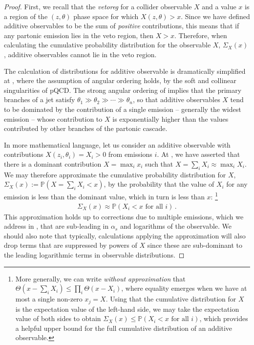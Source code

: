 \begin{proof}

First, we recall that the \emph{\gls{vetoreg}} for a collider observable \(X\) and a value \(x\) is a region of the \((z, \theta)\) phase space for which \(X(z,\theta) > x\).
%
Since we have defined additive observables to be the sum of \textit{positive} contributions, this means that if any partonic emission lies in the veto region, then \(X > x\).
%
Therefore, when calculating the cumulative probability distribution for the observable \(X\), \(\Sigma_X(x)\), additive observables cannot lie in the veto region.

The calculation of distributions for additive observable is dramatically simplified at , where the assumption of angular ordering holds, by the soft and collinear singularities of pQCD.
%
The strong angular ordering of  implies that the primary branches of a jet satisfy \(\theta_1 \gg \theta_2 \gg \cdots \gg \theta_n\), so that additive observables \(X\) tend to be dominated by the contribution of a single emission -- generally the widest emission -- whose contribution to \(X\) is exponentially higher than the values contributed by other branches of the partonic cascade.

In more mathematical language, let us consider an additive observable with contributions \(X(z_i, \theta_i) = X_i > 0\) from emissions \(i\).
%
At , we have asserted that there is a dominant contribution \(X = \max_i x_i\) such that \(X = \sum_i X_i \approx \max_i X_i\).
%
We may therefore approximate the cumulative probability distribution for \(X\), \(\Sigma_X(x) := \mathbb{P}(X = \sum_i X_i < x)\), by the probability that the value of \(X_i\) for any emission is less than the dominant value, which in turn is less than \(x\):%
\footnote{
    More generally, we can write \textit{without approximation} that \(\Theta(x - \sum_i X_i) \leq \prod_i \Theta(x - X_i)\), where equality emerges when we have at most a single non-zero \(x_j = X\).
    Using that the cumulative distribution for \(X\) is the expectation value of the left-hand side, we may take the expectation value of both sides to obtain \(\Sigma_X(x) \leq \mathbb{P}(X_i < x \text{ for all } i)\), which provides a helpful upper bound for the full cumulative distribution of an additive observable.
}
\begin{align}
    \Sigma_X(x) \approx \mathbb{P}(X_i < x \text{ for all } i)
    \,.
\end{align}
%
This approximation holds up to corrections due to multiple emissions, which we address in , that are sub-leading in \(\alpha_s\) and logarithms of the observable.
%
We should also note that typically, calculations applying the  approximation will also drop terms that are suppressed by powers of \(X\) since these are sub-dominant to the leading logarithmic terms in observable distributions.
\end{proof}



